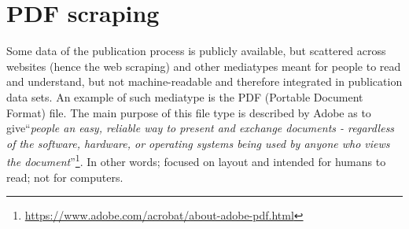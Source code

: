 \documentclass{ou-report}
\begin{document}




        
\section{PDF scraping}
\label{gen_impl:pdf_scraping}
Some data of the publication process is publicly available, but scattered 
across websites (hence the web scraping) and other mediatypes meant for people 
to read and understand, but not machine-readable and therefore integrated in 
publication data sets. An example of such mediatype is the PDF (Portable Document 
Format) file. The main purpose
of this file type is described by Adobe as to give``\textit{people an easy, reliable
way to present and exchange documents - regardless of the software, hardware, or
operating systems being used by anyone who views the
document}''\footnote{\url{https://www.adobe.com/acrobat/about-adobe-pdf.html}}. 
In other words; focused on layout and intended for humans to read; not for
computers. 
\end{document}
